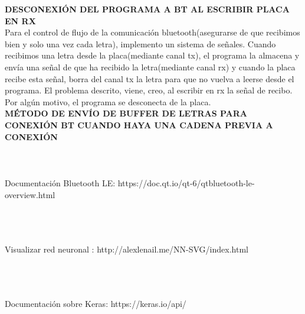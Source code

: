 \begin{mimargen}{-1cm}{-1cm}
\textbf{DESCONEXIÓN DEL PROGRAMA A BT AL ESCRIBIR PLACA EN RX}\\
Para el control de flujo de la comunicación bluetooth(asegurarse de que recibimos
bien y solo una vez cada letra), implemento un sistema de señales.
Cuando recibimos una letra desde la placa(mediante canal tx), el programa la almacena y
envía una señal de que ha recibido la letra(mediante canal rx) y cuando la placa
recibe esta señal, borra del canal tx la letra para que no vuelva a leerse desde el
programa.
El problema descrito, viene, creo, al escribir en rx la señal de recibo. Por algún
motivo, el programa se desconecta de la placa.\\


\textbf{MÉTODO DE ENVÍO DE BUFFER DE LETRAS PARA CONEXIÓN BT CUANDO HAYA UNA CADENA
PREVIA A CONEXIÓN}\\

~\\~\\~\\Documentación Bluetooth LE:
https://doc.qt.io/qt-6/qtbluetooth-le-overview.html

~\\~\\~\\Visualizar red neuronal :
http://alexlenail.me/NN-SVG/index.html

~\\~\\~\\Documentación sobre Keras:
https://keras.io/api/

\end{mimargen}